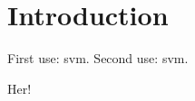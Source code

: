 \chapter{Introduction}

\vspace{2cm}

First use: \gls{svm}. Second use: \gls{svm}.


\missingfigure Her!


\cite{pdftest}

\cite{afhandlingtest}